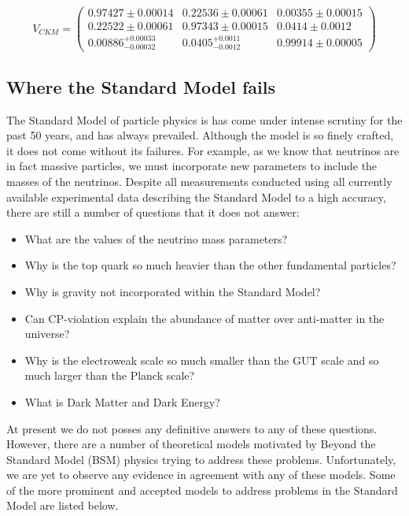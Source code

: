 \begin{equation} \label{eqn-ckmValues}
V_{CKM}
=
\begin{pmatrix}
0.97427 \pm 0.00014 & 0.22536 \pm 0.00061 & 0.00355 \pm 0.00015 \\
0.22522 \pm 0.00061 & 0.97343 \pm 0.00015 & 0.0414 \pm 0.0012 \\
0.00886^{+0.00033}_{-0.00032} & 0.0405^{+0.0011}_{-0.0012} & 0.99914 \pm 0.00005
\end{pmatrix}
\end{equation}

\subsection{Where the Standard Model fails} \label{subsec-SMFailures}

The Standard Model of particle physics is has come under intense scrutiny for the past 50 years, and has always prevailed. Although the model is so finely crafted, it does not come without its failures. For example, as we know that neutrinos are in fact massive particles, we must incorporate new parameters to include the masses of the neutrinos. Despite all measurements conducted using all currently available experimental data describing the Standard Model to a high accuracy, there are still a number of questions that it does not answer:

\begin{itemize}
	\item What are the values of the neutrino mass parameters?
	\item Why is the top quark so much heavier than the other fundamental particles?
	\item Why is gravity not incorporated within the Standard Model?
	\item Can CP-violation explain the abundance of matter over anti-matter in the universe?
	\item Why is the electroweak scale so much smaller than the GUT scale and so much larger than the Planck scale? 
	\item What is Dark Matter and Dark Energy?
\end{itemize} 

At present we do not posses any definitive answers to any of these questions. However, there are a number of theoretical models motivated by Beyond the Standard Model (BSM) physics trying to address these problems. Unfortunately, we are yet to observe any evidence in agreement with any of these models. Some of the more prominent and accepted models to address problems in the Standard Model are listed below.

